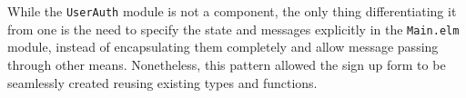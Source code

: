While the \texttt{UserAuth} module is not a component, the only thing differentiating it from one is the need to specify the state and messages explicitly in the \texttt{Main.elm} module, instead of encapsulating them completely and allow message passing through other means. Nonetheless, this pattern allowed the sign up form to be seamlessly created reusing existing types and functions.